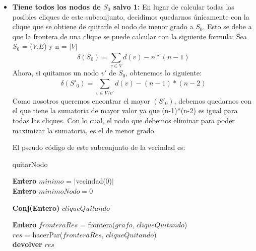 \begin{itemize}
\item \textbf{Tiene todos los nodos de $S_{0}$ salvo 1:} \newline En lugar de calcular todas las posibles cliques de este subconjunto, decidimos quedarnos únicamente con la clique que se obtiene de quitarle el nodo de menor grado a $S_{0}$. Esto se debe a que la frontera de una clique se puede calcular con la siguiente formula:\newline
Sea $S_{0}$ = ($V$,$E$) y n = $|$$V$$|$
\begin{equation}
  \delta(S_{0}) = \sum_{v \in V}^{} d(v) - n*(n-1)
\end{equation}
Ahora, si quitamos un nodo $v'$ de $S_{0}$, obtenemos lo siguiente:
\begin{equation}
  \delta(S'_{0}) = \sum_{v \in V/v'}^{} d(v) - (n-1)*(n-2)
\end{equation}
Como nosotros queremos encontrar el mayor \delta$(S'_{0})$, debemos quedarnos con el que tiene la sumatoria de mayor valor ya que (n-1)*(n-2) es igual para todas las cliques. Con lo cual, el nodo que debemos eliminar para poder maximizar la sumatoria, es el de menor grado.

El pseudo código de este subconjunto de la vecindad es:\newline
\begin{algorithm}[H]
    \SetAlgoLined
    \caption{quitarNodo}
	
    \textbf{Entero} $minimo$ = $|$vecindad(0)$|$ \\	
    \textbf{Entero} $minimoNodo = 0$ \\
    
    \textbf{Conj(Entero)} $cliqueQuitando$\\

    
    \textbf{Entero} $fronteraRes$ = frontera($grafo$, $cliqueQuitando$)\\
    $res$ = hacerPar($fronteraRes$, $cliqueQuitando$)\\
    \textbf{devolver} $res$ \\
\end{algorithm}


\end{itemize}
